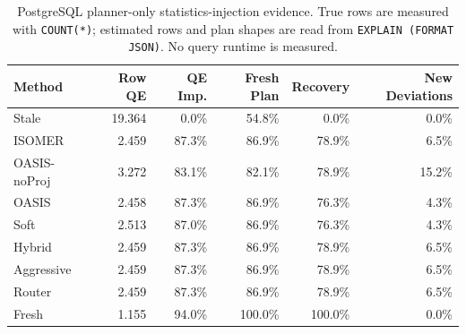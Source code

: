 \begin{table}[t]
  \centering
  \small
  \caption{PostgreSQL planner-only statistics-injection evidence. True rows are measured with \texttt{COUNT(*)}; estimated rows and plan shapes are read from \texttt{EXPLAIN (FORMAT JSON)}. No query runtime is measured.}
  \label{tab:postgres_planner_stats_injection}
  \setlength{\tabcolsep}{4pt}
  \begin{tabular}{lrrrrr}
    \toprule
    Method & Row QE & QE Imp. & Fresh Plan & Recovery & New Deviations \\
    \midrule
    Stale & 19.364 & 0.0\% & 54.8\% & 0.0\% & 0.0\% \\
    ISOMER & 2.459 & 87.3\% & 86.9\% & 78.9\% & 6.5\% \\
    OASIS-noProj & 3.272 & 83.1\% & 82.1\% & 78.9\% & 15.2\% \\
    OASIS & 2.458 & 87.3\% & 86.9\% & 76.3\% & 4.3\% \\
    Soft & 2.513 & 87.0\% & 86.9\% & 76.3\% & 4.3\% \\
    Hybrid & 2.459 & 87.3\% & 86.9\% & 78.9\% & 6.5\% \\
    Aggressive & 2.459 & 87.3\% & 86.9\% & 78.9\% & 6.5\% \\
    Router & 2.459 & 87.3\% & 86.9\% & 78.9\% & 6.5\% \\
    Fresh & 1.155 & 94.0\% & 100.0\% & 100.0\% & 0.0\% \\
    \bottomrule
  \end{tabular}
\end{table}
